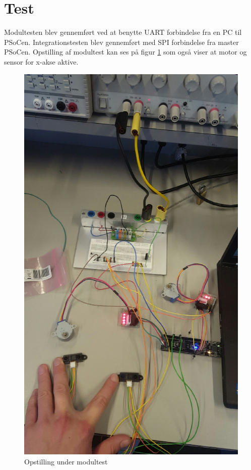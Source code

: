 \section{Test}
Modultesten blev gennemført ved at benytte UART forbindelse fra en PC til PSoCen. Integrationstesten blev gennemført med SPI forbindelse fra master PSoCen. Opstilling af modultest kan ses på figur \ref{x_sensor_start} som også viser at motor og sensor for x-akse aktive.

\begin{figure}[H]
\includegraphics[scale=0.068]{x_sensor_start.jpg}
\caption{Opstilling under modultest}
\label{x_sensor_start}
\end{figure}

